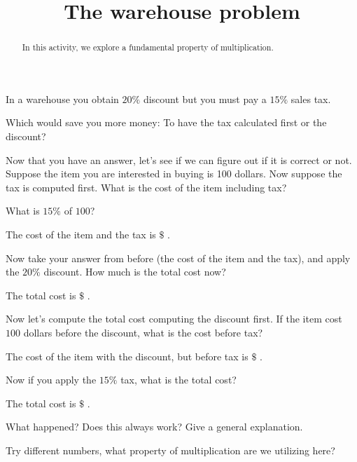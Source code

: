 \documentclass{ximera}
\title{The warehouse problem}
\begin{document}
\begin{abstract}
In this activity, we explore a fundamental property of multiplication. 
\end{abstract}
\maketitle

\begin{question}
In a warehouse you obtain $20\%$ discount but you must pay a $15\%$
sales tax. 


 Which would save you more money: To have the tax calculated
  first or the discount?
\begin{solution}
\begin{multiple-choice}
\end{multiple-choice}
\end{solution}
Now that you have an answer, let's see if we can figure out if it is
correct or not. Suppose the item you are interested in buying is 100
dollars. Now suppose the tax is computed first. What is the cost of
the item including tax?
\begin{solution}
\begin{hint}
What is $15\%$ of $100$?  
\end{hint}
The cost of the item and the tax is
\(\$\) .
\end{solution}
 Now take your answer from before (the cost of the item and the tax),
and apply the $20\%$ discount. How much is the total cost now?
\begin{solution}
The total cost is \(\$\) . 
\end{solution}
 Now let's compute the total cost computing the discount first. If the
item cost $100$ dollars before the discount, what is the cost before tax?
\begin{solution}
The cost of the item with the discount, but before tax is \(\$\) . 
\end{solution}
 Now if you apply the $15\%$ tax, what is the total cost?
\begin{solution}
The total cost is \(\$\) .
\end{solution} 
 What happened? Does this always work? Give a general explanation.
\begin{free-response}
Try different numbers, what property of multiplication are we
utilizing here?
\end{free-response}

\end{question}
\end{document}
